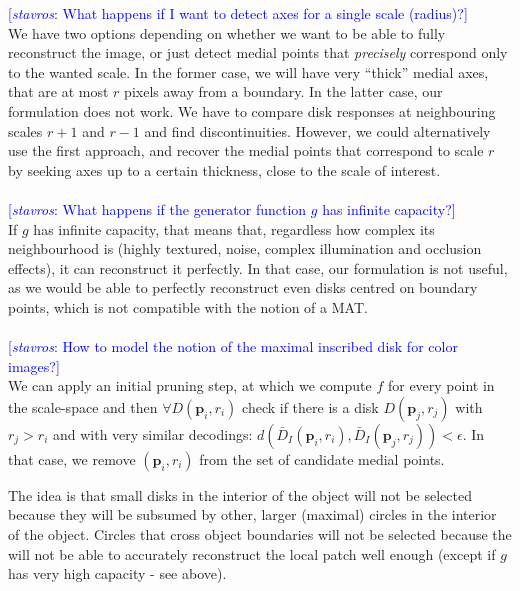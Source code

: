 \documentclass{article}
\newcommand{\stavros}[1]{{\textcolor{blue}{[\emph{stavros}: #1]}}}
\renewcommand{\vec}[1]{\mathbf{#1}}
\def\point{\vec{p}}
\begin{document}
\stavros{What happens if I want to detect axes for a single scale (radius)?} \\
We have two options depending on whether we want to be able to fully reconstruct the image, or just detect
medial points that \emph{precisely} correspond only to the wanted scale. 
In the former case, we will have very ``thick'' medial axes, that are at most $r$ pixels away from a boundary.
In the latter case, our formulation does not work. We have to compare disk responses at neighbouring scales $r+1$
and $r-1$ and find discontinuities. However, we could alternatively use the first approach, and recover the 
medial points that correspond to scale $r$ by seeking axes up to a certain thickness, close to the scale of interest.\\\\
\stavros{What happens if the generator function $g$ has infinite capacity?} \\
If $g$ has infinite capacity, that means that, regardless how complex its neighbourhood is (highly textured, noise, complex illumination and occlusion effects), it can reconstruct it perfectly.
In that case, our formulation is not useful, as we would be able to perfectly reconstruct even disks centred on boundary points, which is not compatible with the notion of a MAT. \\\\
\stavros{How to model the notion of the maximal inscribed disk for color images?} \\
We can apply an initial pruning step, at which we compute $f$ for every point in the scale-space and then $\forall D(\point_i,r_i)$ check if there is a disk $D(\point_j,r_j)$ with $r_j > r_i$ and with very similar decodings: 
$d(\bar D_I(\point_i,r_i), \bar D_I(\point_j,r_j)) < \epsilon$. In that case, we remove $(\point_i, r_i)$ from the set
of candidate medial points.

The idea is that small disks in the interior of the object will not  be selected because they will be subsumed by other, larger (maximal) circles in the interior of the object. 
Circles that cross object boundaries will not be selected because the will not be able to accurately reconstruct the local patch well enough (except if $g$ has very high  capacity - see above).
\end{document}
